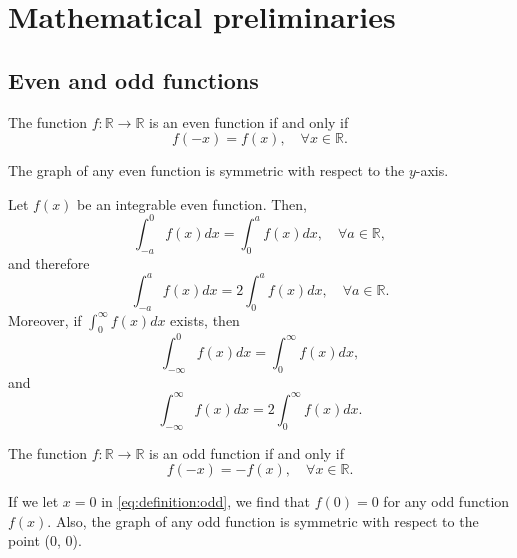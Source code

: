 \chapter{Mathematical preliminaries}

\section{Even and odd functions}
\begin{definition}
    The function $ f : \mathbb{R} \rightarrow \mathbb{R} $ is an even function
        if and only if
    \begin{equation}
        f(-x) = f(x), \quad \forall x \in \mathbb{R}.
        \label{eq:definition:even}
    \end{equation}
\end{definition}
The graph of any even function is symmetric with respect to the $ y $-axis.

\begin{lemma}
    Let $ f(x) $ be an integrable even function. Then,
    \begin{equation}
        \int_{-a}^{0} f(x) dx = \int_{0}^{a} f(x) dx, \quad \forall a \in
            \mathbb{R},
    \end{equation}
    and therefore
    \begin{equation}
        \int_{-a}^{a} f(x) dx = 2 \int_{0}^{a} f(x) dx, \quad \forall a \in
            \mathbb{R}.
    \end{equation}
    Moreover, if $ \int_{0}^{\infty} f(x) dx $ exists, then
    \begin{equation}
        \int_{-\infty}^{0} f(x) dx = \int_{0}^{\infty} f(x) dx,
    \end{equation}
    and
    \begin{equation}
        \int_{-\infty}^{\infty} f(x) dx = 2 \int_{0}^{\infty} f(x) dx.
    \end{equation}
\end{lemma}

\begin{definition}
    The function $ f : \mathbb{R} \rightarrow \mathbb{R} $ is an odd function
        if and only if
    \begin{equation}
        f(-x) = -f(x), \quad \forall x \in \mathbb{R}.
        \label{eq:definition:odd}
    \end{equation}
\end{definition}
If we let $ x = 0 $ in \eqref{eq:definition:odd}, we find that $ f(0) = 0 $ for
    any odd function $ f(x) $.
Also, the graph of any odd function is symmetric with respect to the point
    (0, 0).

